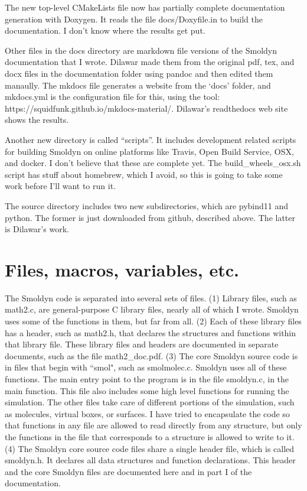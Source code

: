 \documentclass {book}
\begin{document}
The new top-level CMakeLists file now has partially complete documentation generation with Doxygen. It reads the file docs/Doxyfile.in to build the documentation. I don't know where the results get put.

Other files in the docs directory are markdown file versions of the Smoldyn documentation that I wrote. Dilawar made them from the original pdf, tex, and docx files in the documentation folder using pandoc and then edited them manaully. The mkdocs file generates a website from the `docs' folder, and mkdocs.yml is the configuration file for this, using the tool: https://squidfunk.github.io/mkdocs-material/. Dilawar's readthedocs web site shows the results.

Another new directory is called ``scripts''. It includes development related scripts for building Smoldyn on online platforms like Travis, Open Build Service, OSX, and docker. I don't believe that these are complete yet. The build\_wheels\_osx.sh script has stuff about homebrew, which I avoid, so this is going to take some work before I'll want to run it.

The source directory includes two new subdirectories, which are pybind11 and python. The former is just downloaded from github, described above. The latter is Dilawar's work.


\chapter{Files, macros, variables, etc.}

The Smoldyn code is separated into several sets of files.  (1) Library files, such as math2.c, are general-purpose C library files, nearly all of which I wrote.  Smoldyn uses some of the functions in them, but far from all.  (2) Each of these library files has a header, such as math2.h, that declares the structures and functions within that library file.  These library files and headers are documented in separate documents, such as the file math2\_doc.pdf.  (3) The core Smoldyn source code is in files that begin with ``smol", such as smolmolec.c.  Smoldyn uses all of these functions.  The main entry point to the program is in the file smoldyn.c, in the main function.  This file also includes some high level functions for running the simulation.  The other files take care of different portions of the simulation, such as molecules, virtual boxes, or surfaces.  I have tried to encapsulate the code so that functions in any file are allowed to read directly from any structure, but only the functions in the file that corresponds to a structure is allowed to write to it.  (4) The Smoldyn core source code files share a single header file, which is called smoldyn.h.  It declares all data structures and function declarations.  This header and the core Smoldyn files are documented here and in part I of the documentation.
\end{document}
